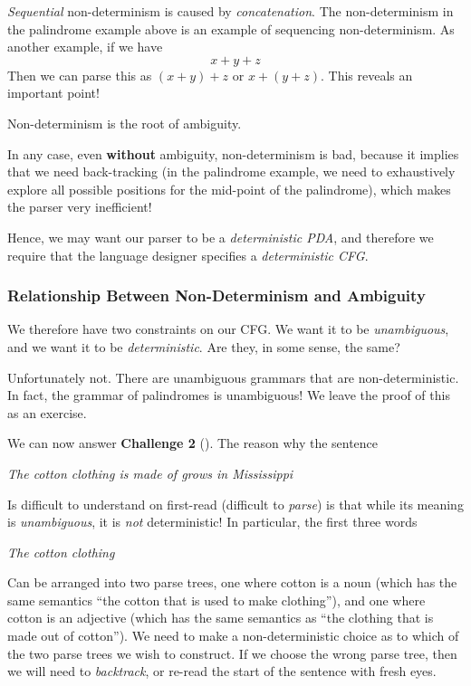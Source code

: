\textit{Sequential} non-determinism is caused by \textit{concatenation}. The non-determinism in the palindrome example above is an example of sequencing non-determinism. As another example, if we have 
\[ x + y + z \]
Then we can parse this as $(x + y) + z$ or $x + (y + z)$. This reveals an important point!

\begin{center}
    Non-determinism is the root of ambiguity.
\end{center}

In any case, even \textbf{without} ambiguity, non-determinism is bad, because it implies that we need back-tracking (in the palindrome example, we need to exhaustively explore all possible positions for the mid-point of the palindrome), which makes the parser very inefficient!

Hence, we may want our parser to be a \textit{deterministic PDA}, and therefore we require that the language designer specifies a \textit{deterministic CFG}.

\subsubsection{Relationship Between Non-Determinism and Ambiguity}
We therefore have two constraints on our CFG. We want it to be \textit{unambiguous}, and we want it to be \textit{deterministic}. Are they, in some sense, the same?

Unfortunately not. There are unambiguous grammars that are non-deterministic. In fact, the grammar of palindromes is unambiguous! We leave the proof of this as an exercise.

We can now answer \textbf{\textsf{Challenge 2}} (). The reason why the sentence 
\begin{center}
    \textit{The cotton clothing is made of grows in Mississippi}
\end{center}
Is difficult to understand on first-read (difficult to \textit{parse}) is that while its meaning is \textit{unambiguous}, it is \textit{not} deterministic! In particular, the first three words
\begin{center}
    \textit{The cotton clothing}
\end{center}
Can be arranged into two parse trees, one where cotton is a noun (which has the same semantics ``the cotton that is used to make clothing''), and one where cotton is an adjective (which has the same semantics as ``the clothing that is made out of cotton''). We need to make a non-deterministic choice as to which of the two parse trees we wish to construct. If we choose the wrong parse tree, then we will need to \textit{backtrack}, or re-read the start of the sentence with fresh eyes. 

